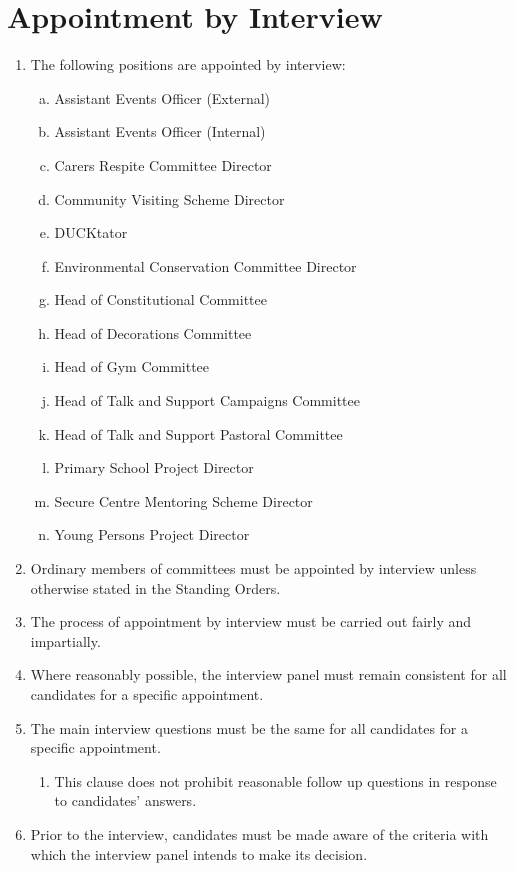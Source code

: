 \documentclass[12pt]{article}  %
\begin{document}
\section{Appointment by Interview}
\begin{enumerate}
	\item The following positions are appointed by interview:
	\begin{enumerate}[(a)]
		\item Assistant Events Officer (External)
		\item Assistant Events Officer (Internal)
		\item Carers Respite Committee Director
		\item Community Visiting Scheme Director
		\item DUCKtator
		\item Environmental Conservation Committee Director
		\item Head of Constitutional Committee
		\item Head of Decorations Committee
		\item Head of Gym Committee
		\item Head of Talk and Support Campaigns Committee
		\item Head of Talk and Support Pastoral Committee
		\item Primary School Project Director
		\item Secure Centre Mentoring Scheme Director
		\item Young Persons Project Director
	\end{enumerate}
	\item Ordinary members of committees must be appointed by interview unless otherwise stated in the Standing Orders.
	\item The process of appointment by interview must be carried out fairly and impartially.
	\item Where reasonably possible, the interview panel must remain consistent for all candidates for a specific appointment.
	\item The main interview questions must be the same for all candidates for a specific appointment.
	\begin{enumerate}
		\item This clause does not prohibit reasonable follow up questions in response to candidates’ answers.
	\end{enumerate}
	\item Prior to the interview, candidates must be made aware of the criteria with which the interview panel intends to make its decision.

\end{enumerate}
\end{document}
